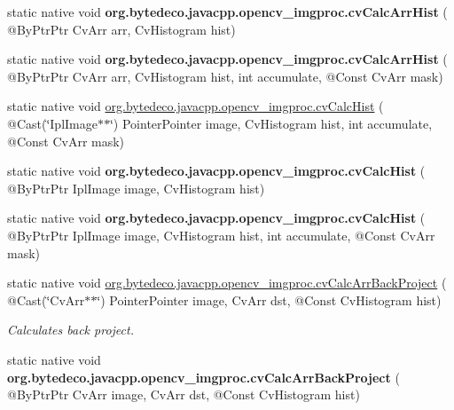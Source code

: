 \begin{DoxyCompactItemize}
\mbox{\label{group__imgproc__c_ga1b0a676395ba28ecd250180624841caf}} 
static native void {\bfseries org.\+bytedeco.\+javacpp.\+opencv\+\_\+imgproc.\+cv\+Calc\+Arr\+Hist} ( @By\+Ptr\+Ptr Cv\+Arr arr, Cv\+Histogram hist)
\item 
\mbox{\label{group__imgproc__c_ga770a0d6c6c08a3576810d314983ad389}} 
static native void {\bfseries org.\+bytedeco.\+javacpp.\+opencv\+\_\+imgproc.\+cv\+Calc\+Arr\+Hist} ( @By\+Ptr\+Ptr Cv\+Arr arr, Cv\+Histogram hist, int accumulate, @Const Cv\+Arr mask)
\item 
static native void \hyperlink{group__imgproc__c_gacbc8dc98c5e08ad4a51431b276bd0044}{org.\+bytedeco.\+javacpp.\+opencv\+\_\+imgproc.\+cv\+Calc\+Hist} ( @Cast(\char`\"{}Ipl\+Image$\ast$$\ast$\char`\"{}) Pointer\+Pointer image, Cv\+Histogram hist, int accumulate, @Const Cv\+Arr mask)
\item 
\mbox{\label{group__imgproc__c_ga64047b61f02fcfacad7495107f905591}} 
static native void {\bfseries org.\+bytedeco.\+javacpp.\+opencv\+\_\+imgproc.\+cv\+Calc\+Hist} ( @By\+Ptr\+Ptr Ipl\+Image image, Cv\+Histogram hist)
\item 
\mbox{\label{group__imgproc__c_gaa25ad24d7c8dc276f62736e932795ecd}} 
static native void {\bfseries org.\+bytedeco.\+javacpp.\+opencv\+\_\+imgproc.\+cv\+Calc\+Hist} ( @By\+Ptr\+Ptr Ipl\+Image image, Cv\+Histogram hist, int accumulate, @Const Cv\+Arr mask)
\item 
static native void \hyperlink{group__imgproc__c_ga579d781d25a70bccc1432e6c6d1fc95c}{org.\+bytedeco.\+javacpp.\+opencv\+\_\+imgproc.\+cv\+Calc\+Arr\+Back\+Project} ( @Cast(\char`\"{}Cv\+Arr$\ast$$\ast$\char`\"{}) Pointer\+Pointer image, Cv\+Arr dst, @Const Cv\+Histogram hist)
\begin{DoxyCompactList}\small\item\em Calculates back project. \end{DoxyCompactList}\item 
\mbox{\label{group__imgproc__c_ga8e78f40f55077abe6682f9659c0ff7a6}} 
static native void {\bfseries org.\+bytedeco.\+javacpp.\+opencv\+\_\+imgproc.\+cv\+Calc\+Arr\+Back\+Project} ( @By\+Ptr\+Ptr Cv\+Arr image, Cv\+Arr dst, @Const Cv\+Histogram hist)
\item 

\end{DoxyCompactItemize}
